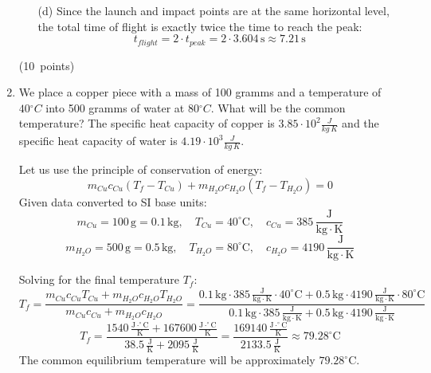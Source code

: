 \documentclass[12pt]{letter}
\begin{document}
\begin{enumerate}
\begin{enumerate}
\item[(d)] Since the launch and impact points are at the same horizontal level, the total time of flight is exactly twice the time to reach the peak:
$$t_{flight} = 2 \cdot t_{peak} = 2 \cdot 3.604\,\mathrm{s} \approx 7.21\,\mathrm{s}$$
\end{enumerate}

\hfill (10~points)


\bigskip
\item We place a copper piece with a mass of 100 gramms and a temperature of $40{}^{\circ}C$ into 500 gramms of water at $80{}^{\circ}C$. What will be the common temperature? The specific heat capacity of copper is $3.85 \cdot 10^{2}\frac{J}{kg\,K}$ and the specific heat capacity of water is $4.19 \cdot 10^{3}\frac{J}{kg\,K}$.

\bigskip

\begin{center}
\end{center}

Let us use the principle of conservation of energy:
$$m_{Cu} c_{Cu} (T_f - T_{Cu}) + m_{H_{2}O} c_{H_{2}O} (T_f - T_{H_{2}O}) = 0$$
Given data converted to SI base units:
$$m_{Cu} = 100\,\mathrm{g} = 0.1\,\mathrm{kg}, \quad T_{Cu} = 40^\circ\mathrm{C}, \quad c_{Cu} = 385\,\mathrm{\frac{J}{kg \cdot K}}$$
$$m_{H_{2}O} = 500\,\mathrm{g} = 0.5\,\mathrm{kg}, \quad T_{H_{2}O} = 80^\circ\mathrm{C}, \quad c_{H_{2}O} = 4190\,\mathrm{\frac{J}{kg \cdot K}}$$

Solving for the final temperature $T_f$:
$$T_f = \frac{m_{Cu} c_{Cu} T_{Cu} + m_{H_{2}O} c_{H_{2}O} T_{H_{2}O}}{m_{Cu} c_{Cu} + m_{H_{2}O} c_{H_{2}O}} = \frac{0.1\,\mathrm{kg} \cdot 385\,\mathrm{\frac{J}{kg \cdot K}} \cdot 40^\circ\mathrm{C} + 0.5\,\mathrm{kg} \cdot 4190\,\mathrm{\frac{J}{kg \cdot K}} \cdot 80^\circ\mathrm{C}}{0.1\,\mathrm{kg} \cdot 385\,\mathrm{\frac{J}{kg \cdot K}} + 0.5\,\mathrm{kg} \cdot 4190\,\mathrm{\frac{J}{kg \cdot K}}}$$
$$T_f = \frac{1540\,\mathrm{\frac{J \cdot ^\circ C}{K}} + 167600\,\mathrm{\frac{J \cdot ^\circ C}{K}}}{38.5\,\mathrm{\frac{J}{K}} + 2095\,\mathrm{\frac{J}{K}}} = \frac{169140\,\mathrm{\frac{J \cdot ^\circ C}{K}}}{2133.5\,\mathrm{\frac{J}{K}}} \approx 79.28^\circ\mathrm{C}$$
The common equilibrium temperature will be approximately $79.28^\circ\mathrm{C}$.


\end{enumerate}
\end{document}
